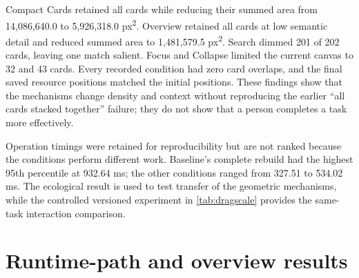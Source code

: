 \begin{table}[htbp]
\centering
\caption{Objective display results on the playable 241-node behaviour tree. Reductions are relative to Baseline.}
\label{tab:playable241}
\small
{}
\end{table}

Compact Cards retained all cards while reducing their summed area from 14,086,640.0 to 5,926,318.0 px\textsuperscript{2}. Overview retained all cards at low semantic detail and reduced summed area to 1,481,579.5 px\textsuperscript{2}. Search dimmed 201 of 202 cards, leaving one match salient. Focus and Collapse limited the current canvas to 32 and 43 cards. Every recorded condition had zero card overlaps, and the final saved resource positions matched the initial positions. These findings show that the mechanisms change density and context without reproducing the earlier ``all cards stacked together'' failure; they do not show that a person completes a task more effectively.

Operation timings were retained for reproducibility but are not ranked because the conditions perform different work. Baseline's complete rebuild had the highest 95th percentile at 932.64 ms; the other conditions ranged from 327.51 to 534.02 ms. The ecological result is used to test transfer of the geometric mechanisms, while the controlled versioned experiment in \cref{tab:dragscale} provides the same-task interaction comparison.

\section{Runtime-path and overview results}


